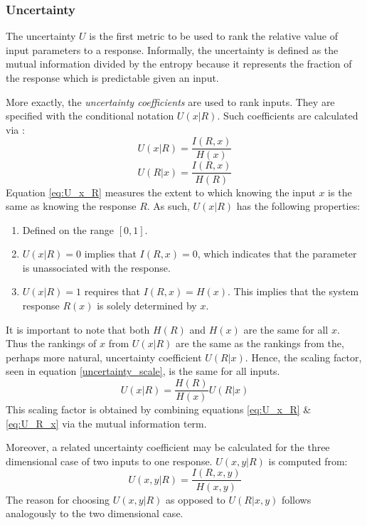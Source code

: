 \documentclass[preprint,12pt]{elsarticle}
\begin{document}
\subsubsection{Uncertainty}
\label{sec:uncertainty}

The uncertainty $U$ is the first metric to be used to rank the relative value of input 
parameters to a response.  Informally, the uncertainty is defined
as the mutual information divided by the entropy because it represents the fraction of the 
response which is predictable given an input.

More exactly, the \emph{uncertainty coefficients} are used to rank inputs.  They are specified with the 
conditional notation $U(x|R)$.  Such coefficients are calculated via \cite{Yao2003}:
\begin{equation}
U(x|R) = \frac{I(R,x)}{H(x)}
\label{eq:U_x_R}
\end{equation}
\begin{equation}
U(R|x) = \frac{I(R,x)}{H(R)}
\label{eq:U_R_x}
\end{equation}
Equation \ref{eq:U_x_R} measures the extent to which knowing the input $x$ is the same as knowing the response $R$.  As such, $U(x|R)$ has the following properties:
\begin{enumerate}
    \item Defined on the range $[0, 1]$.
    \item $U(x|R) = 0$ implies that $I(R,x) = 0$, which indicates that the parameter
        is unassociated with the response.
    \item $U(x|R) = 1$ requires that $I(R,x) = H(x)$.  This implies that
        the system response $R(x)$ is solely determined by $x$.
\end{enumerate}

It is important to note that both $H(R)$ and $H(x)$ are the same for all $x$.  Thus the rankings of $x$ from $U(x|R)$ are the same as the rankings from the, perhaps more natural, uncertainty coefficient $U(R|x)$.  Hence, the scaling factor, seen in equation \ref{uncertainty_scale}, is the same for all inputs.
\begin{equation}
U(x|R) = \frac{H(R)}{H(x)} U(R|x)
\label{uncertainty_scale}
\end{equation}
This scaling factor is obtained by combining equations \ref{eq:U_x_R} \& \ref{eq:U_R_x} via the mutual 
information term.

Moreover, a related uncertainty coefficient may be calculated for the three dimensional case of two inputs to one
response.  $U(x,y|R)$ is computed from:
\begin{equation} U(x,y|R) = \frac{I(R,x,y)}{H(x,y)} \end{equation}
The reason for choosing $U(x,y|R)$ as opposed to $U(R|x,y)$ follows analogously to the two dimensional case.
\end{document}
